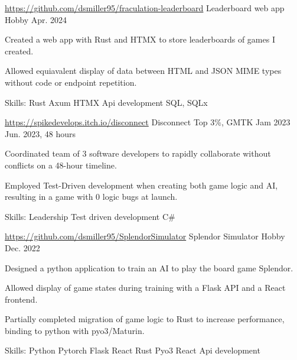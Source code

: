 \begin{cventries}
 \cventry
  {\href{https://github.com/dsmiller95/fraculation-leaderboard}{https://github.com/dsmiller95/fraculation-leaderboard}} %
   {Leaderboard web app} %
   {Hobby} %
   {Apr. 2024} %
   {
     \begin{cvitems} %
      \item {Created a web app with Rust and HTMX to store leaderboards of games I created.}
      \item {Allowed equiavalent display of data between HTML and JSON MIME types without code or endpoint repetition.}
      \item {Skills: Rust \textbullet{} Axum \textbullet{} HTMX \textbullet{} Api development \textbullet{} SQL, SQLx }
     \end{cvitems}
   }

  \cventry
   {\href{https://spikedevelops.itch.io/disconnect}{https://spikedevelops.itch.io/disconnect}} %
    {Disconnect} %
    {Top 3\%, GMTK Jam 2023} %
    {Jun. 2023, 48 hours} %
    {
      \begin{cvitems} %
        \item {Coordinated team of 3 software developers to rapidly collaborate without conflicts on a 48-hour timeline.}
        \item {Employed Test-Driven development when creating both game logic and AI, resulting in a game with 0 logic bugs at launch.}
        \item {Skills: Leadership \textbullet{} Test driven development \textbullet{} C\#}
      \end{cvitems}
    }

 \cventry
  {\href{https://github.com/dsmiller95/SplendorSimulator}{https://github.com/dsmiller95/SplendorSimulator}} %
   {Splendor Simulator} %
   {Hobby} %
   {Dec. 2022} %
   {
     \begin{cvitems} %
      \item {Designed a python application to train an AI to play the board game Splendor.}
      \item {Allowed display of game states during training with a Flask API and a React frontend.}
      \item {Partially completed migration of game logic to Rust to increase performance, binding to python with pyo3/Maturin.}
      \item {Skills: Python \textbullet{} Pytorch \textbullet{} Flask \textbullet{} React \textbullet{} Rust \textbullet{} Pyo3 \textbullet{} React \textbullet{} Api development }
     \end{cvitems}
   }



\end{cventries}
